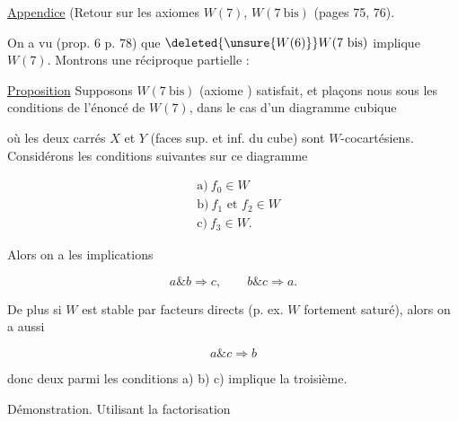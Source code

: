 

 \uline{Appendice} (Retour sur les axiomes $W(7)$, $W(7\ \mathrm{bis})$ (pages 75, 76).

On a vu (prop. 6 p. 78) que $\deleted{\unsure{W(6)}}W(7\ \mathrm{bis})$ implique $W(7)$. Montrons une réciproque partielle :

\uline{Proposition} Supposons $W(7\ \mathrm{bis})$ (axiome   ) satisfait, et plaçons nous sous les conditions de l'énoncé de $W(7)$,  dans le cas d'un diagramme cubique


où les deux carrés $X$ et $Y$ (faces sup. et inf. du cube) sont $W$-cocartésiens. Considérons les conditions suivantes sur ce diagramme

\[
\begin{aligned}
&\text{a)}\ f_0\in W\\
&\text{b)}\ f_1\text{ et }f_2\in W\\
&\text{c)}\ f_3\in W.
\end{aligned}
\]

Alors on a les implications

\[
a\mathbin{\&}b\Longrightarrow c,\qquad b\mathbin{\&}c\Longrightarrow a.
\]

De plus si $W$ est stable par facteurs directs (p. ex. $W$ fortement saturé), alors on a aussi

\[
a\mathbin{\&}c\Longrightarrow b
\]

donc  deux  parmi les conditions a) b) c) implique la troisième.

Démonstration. Utilisant la factorisation
